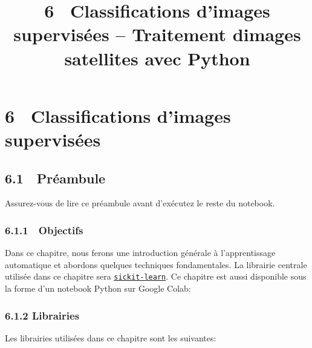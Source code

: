 \documentclass[
]{article}
\title{6~ Classifications d'images supervisées -- Traitement
d\textquotesingle images satellites avec Python}
\author{}
\date{}
\makeatletter
\newcommand*\pandocbounded[1]{%
  \sbox\pandoc@box{#1}%
  \Gscale@div\@tempa{\textheight}{\dimexpr\ht\pandoc@box+\dp\pandoc@box\relax}%
  \Gscale@div\@tempb{\linewidth}{\wd\pandoc@box}%
  \ifdim\@tempb\p@<\@tempa\p@\let\@tempa\@tempb\fi%
  \ifdim\@tempa\p@<\p@\scalebox{\@tempa}{\usebox\pandoc@box}%
  \else\usebox{\pandoc@box}%
  \fi%
}
\makeatother
\begin{document}
\maketitle

\label{quarto-document-content}
\label{title-block-header}
\section{\texorpdfstring{\protect\hypertarget{sec-chap05}{}{{6}~
{Classifications d'images
supervisées}}}{6~ Classifications d'images supervisées}}\label{classifications-dimages-supervisuxe9es}

\subsection{\texorpdfstring{{6.1} {🚀}
Préambule}{6.1 🚀 Préambule}}\label{pruxe9ambule}

Assurez-vous de lire ce préambule avant d'exécutez le reste du notebook.

\subsubsection{\texorpdfstring{{6.1.1} {🎯}
Objectifs}{6.1.1 🎯 Objectifs}}\label{objectifs}

Dans ce chapitre, nous ferons une introduction générale à
l'apprentissage automatique et abordons quelques techniques
fondamentales. La librairie centrale utilisée dans ce chapitre sera
\href{https://scikit-learn.org/}{\texttt{sickit-learn}}. Ce chapitre est
aussi disponible sous la forme d'un notebook Python sur Google Colab:

\href{https://colab.research.google.com/github/sfoucher/TraitementImagesPythonVol1/blob/main/notebooks/05-ClassificationsSupervisees.ipynb}{\pandocbounded{}}

\subsubsection{\texorpdfstring{{6.1.2}
Librairies}{6.1.2 Librairies}}\label{librairies}

Les librairies utilisées dans ce chapitre sont les suivantes:
\end{document}
